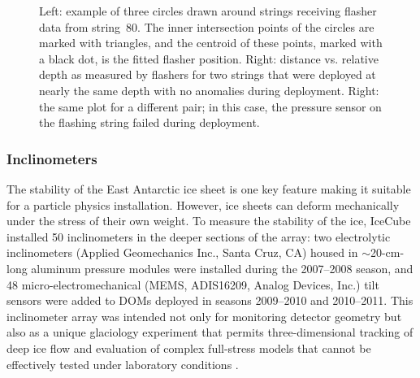 \begin{figure}[!ht]
  \captionsetup[subfigure]{labelformat=empty} \centering
  \caption{Left: example of three circles drawn around strings
    receiving flasher data from string~80. The inner intersection
    points of the circles are marked with triangles, and the centroid
    of these points, marked with a black dot, is the fitted flasher position. Right: distance vs. relative depth as measured by flashers for
    two strings that were deployed at nearly the same depth with no
    anomalies during deployment. Right: the same plot for a different pair;
    in this case, the pressure sensor on the flashing string failed during
    deployment.}
  \label{fig:trilateration}
\end{figure}


\subsubsection{Inclinometers}

The stability of the East Antarctic ice sheet is one key feature making it
suitable for a particle physics installation.  However, ice sheets can
deform mechanically under the stress of their own weight.  To measure the
stability of the ice, IceCube installed 50
inclinometers in the deeper sections of the array: two 
electrolytic inclinometers (Applied Geomechanics Inc., Santa Cruz, CA)
housed in $\sim$20-cm-long aluminum pressure modules were installed during
the 2007--2008 season, and 48 micro-electromechanical (MEMS, ADIS16209, Analog Devices, Inc.) tilt sensors were added to DOMs deployed in seasons 2009--2010 and
2010--2011.  This inclinometer array was intended not only for monitoring
detector geometry but also as a unique glaciology experiment that
permits three-dimensional tracking of deep ice flow and evaluation of complex
full-stress models that cannot be effectively tested under laboratory
conditions \cite{pattyn03}.

